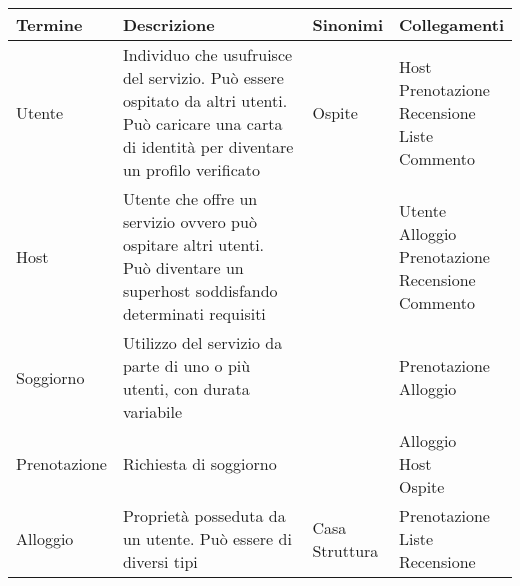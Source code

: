 \small
\setlength\extrarowheight{2pt}
\begin{tabular}{|l|p{4.95cm}|l|l|}
    \hline\bfseries Termine & \bfseries Descrizione                                                                                                                              & \bfseries Sinonimi                 & \bfseries Collegamenti                                              \\\hline
    Utente                  & Individuo che usufruisce del servizio. Può essere ospitato da altri utenti. Può caricare una carta di identità per diventare un profilo verificato & {Ospite}                           & \makecell[tl]{Host\\Prenotazione\\Recensione\\Liste\\Commento}      \\\hline
    Host                    & Utente che offre un servizio ovvero può ospitare altri utenti. Può diventare un superhost soddisfando determinati requisiti                        &                                    & \makecell[tl]{Utente\\Alloggio\\Prenotazione\\Recensione\\Commento} \\\hline
    Soggiorno               & {Utilizzo del servizio da parte di uno o più utenti, con durata variabile}                                                                         &                                    & \makecell[tl]{Prenotazione\\Alloggio}                               \\\hline
    Prenotazione            & Richiesta di soggiorno                                                                                                                             &                                    & \makecell[tl]{Alloggio\\Host\\Ospite}                               \\\hline
    Alloggio                & Proprietà posseduta da un utente. Può essere di diversi tipi                                                                                       & \makecell[tl]{Casa\\Struttura}     & \makecell[tl]{Prenotazione\\Liste\\Recensione}                       \\\hline

\end{tabular}
